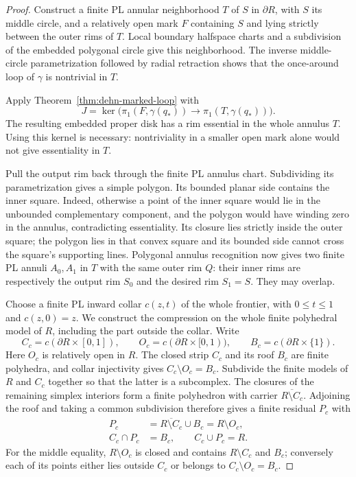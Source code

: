\begin{proof}
Construct a finite PL annular neighborhood $T$ of $S$ in $\partial R$,
with $S$ its middle circle, and a relatively open mark $F$ containing
$S$ and lying strictly between the outer rims of $T$.  Local boundary
halfspace charts and a subdivision of the embedded polygonal circle
give this neighborhood.  The inverse middle-circle parametrization
followed by radial retraction shows that the once-around loop of
$\gamma$ is nontrivial in $T$.

Apply Theorem~\ref{thm:dehn-marked-loop} with
\[
 J=\ker\bigl(\pi_1(F,\gamma(q_*))\longrightarrow
                    \pi_1(T,\gamma(q_*))\bigr).
\]
The resulting embedded proper disk has a rim essential in the whole
annulus $T$.  Using this kernel is necessary: nontriviality in a
smaller open mark alone would not give essentiality in $T$.

Pull the output rim back through the finite PL annulus chart.
Subdividing its parametrization gives a simple polygon.  Its bounded
planar side contains the inner square.  Indeed, otherwise a point of
the inner square would lie in the unbounded complementary component,
and the polygon would have winding zero in the annulus, contradicting
essentiality.  Its closure lies strictly inside the outer square;
the polygon lies in that convex square and its bounded side cannot
cross the square's supporting lines.  Polygonal annulus recognition
now gives two finite PL annuli $A_0,A_1$ in $T$ with the same outer
rim $Q$: their inner rims are respectively the output rim $S_0$ and
the desired rim $S_1=S$.  They may overlap.

Choose a finite PL inward collar $c(z,t)$ of the whole frontier, with
$0\leq t\leq1$ and $c(z,0)=z$.  We construct the compression on the
whole finite polyhedral model of $R$, including the part outside the
collar.  Write
\[
 C_c=c(\partial R\times[0,1]),\qquad
 O_c=c(\partial R\times[0,1)),\qquad
 B_c=c(\partial R\times\{1\}).
\]
Here $O_c$ is relatively open in $R$.  The closed strip $C_c$ and
its roof $B_c$ are finite polyhedra, and collar injectivity gives
$C_c\setminus O_c=B_c$.  Subdivide the finite models of $R$ and
$C_c$ together so that the latter is a subcomplex.  The closures
of the remaining simplex interiors form a finite polyhedron with
carrier $\overline{R\setminus C_c}$.  Adjoining the roof and taking
a common subdivision therefore gives a finite residual $P_c$ with
\begin{equation}
 \begin{aligned}
 P_c&=\overline{R\setminus C_c}\cup B_c=R\setminus O_c,\\
 C_c\cap P_c&=B_c,\qquad C_c\cup P_c=R.
 \end{aligned}
 \label{eq:dehn-collar-residual}
\end{equation}
For the middle equality, $R\setminus O_c$ is closed and contains
$R\setminus C_c$ and $B_c$; conversely each of its points either
lies outside $C_c$ or belongs to $C_c\setminus O_c=B_c$.


\end{proof}
